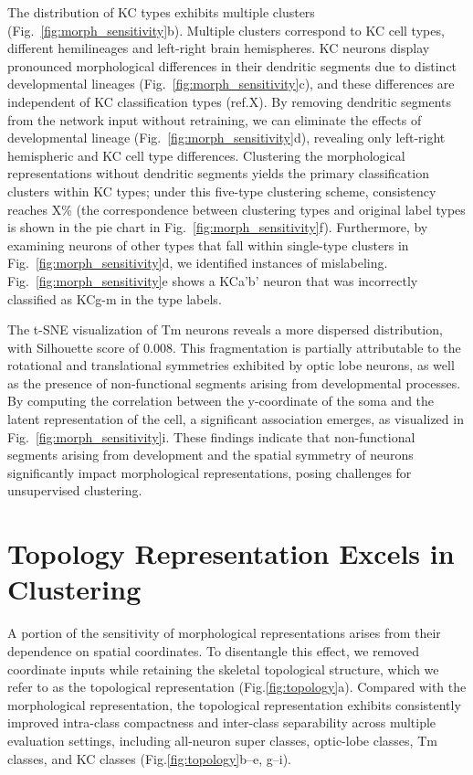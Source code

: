 \documentclass{article}
\begin{document}
The distribution of KC types exhibits multiple clusters ({Fig.~\ref{fig:morph_sensitivity}b}). Multiple clusters correspond to KC cell types, different hemilineages and left-right brain hemispheres. KC neurons display pronounced morphological differences in their dendritic segments due to distinct developmental lineages ({Fig.~\ref{fig:morph_sensitivity}c}), and these differences are independent of KC classification types (ref.X). By removing dendritic segments from the network input without retraining, we can eliminate the effects of developmental lineage ({Fig.~\ref{fig:morph_sensitivity}d}), revealing only left-right hemispheric and KC cell type differences. Clustering the morphological representations without dendritic segments yields the primary classification clusters within KC types; under this five-type clustering scheme, consistency reaches X\% (the correspondence between clustering types and original label types is shown in the pie chart in {Fig.~\ref{fig:morph_sensitivity}f}). Furthermore, by examining neurons of other types that fall within single-type clusters in {Fig.~\ref{fig:morph_sensitivity}d}, we identified instances of mislabeling. {Fig.~\ref{fig:morph_sensitivity}e} shows a KCa'b' neuron that was incorrectly classified as KCg-m in the type labels.

The t-SNE visualization of Tm neurons reveals a more dispersed distribution, with Silhouette score of 0.008. This fragmentation is partially attributable to the rotational and translational symmetries exhibited by optic lobe neurons, as well as the presence of non-functional segments arising from developmental processes. By computing the correlation between the y-coordinate of the soma and the latent representation of the cell, a significant association emerges, as visualized in {Fig.~\ref{fig:morph_sensitivity}i}. 
These findings indicate that non-functional segments arising from development and the spatial symmetry of neurons significantly impact morphological representations, posing challenges for unsupervised clustering.

\section{Topology Representation Excels in Clustering} 

A portion of the sensitivity of morphological representations arises from their dependence on spatial coordinates. To disentangle this effect, we removed coordinate inputs while retaining the skeletal topological structure, which we refer to as the topological representation (Fig.\ref{fig:topology}a). Compared with the morphological representation, the topological representation exhibits consistently improved intra-class compactness and inter-class separability across multiple evaluation settings, including all-neuron super classes, optic-lobe classes, Tm classes, and KC classes (Fig.\ref{fig:topology}b–e, g–i). 
\end{document}
